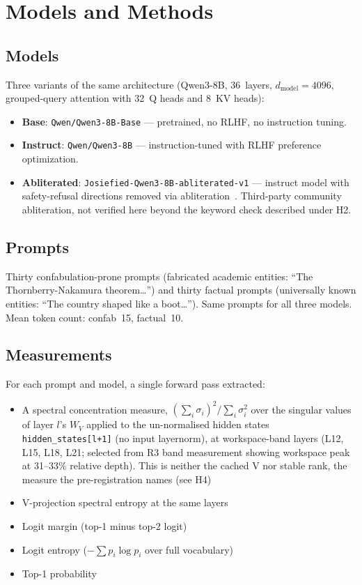 \documentclass[11pt,a4paper]{article}
\begin{document}
\section{Models and Methods}
\label{sec:methods}

\subsection{Models}

Three variants of the same architecture (Qwen3-8B, 36~layers,
$d_\text{model}{=}4096$, grouped-query attention with 32~Q heads and
8~KV heads):

\begin{itemize}[nosep]
\item \textbf{Base}: \texttt{Qwen/Qwen3-8B-Base} --- pretrained,
  no RLHF, no instruction tuning.
\item \textbf{Instruct}: \texttt{Qwen/Qwen3-8B} --- instruction-tuned
  with RLHF preference optimization.
\item \textbf{Abliterated}: \texttt{Josiefied-Qwen3-8B-abliterated-v1}
  --- instruct model with safety-refusal directions removed via
  abliteration~\citep{arditi2024refusal}. Third-party community
  abliteration, not verified here beyond the keyword check described
  under H2.
\end{itemize}

\subsection{Prompts}

Thirty confabulation-prone prompts (fabricated academic entities:
``The Thornberry-Nakamura theorem\ldots'') and thirty factual prompts
(universally known entities: ``The country shaped like a boot\ldots'').
Same prompts for all three models. Mean token count: confab~15,
factual~10.

\subsection{Measurements}

For each prompt and model, a single forward pass extracted:
\begin{itemize}[nosep]
\item A spectral concentration measure,
  $(\sum_i \sigma_i)^2 / \sum_i \sigma_i^2$ over the singular values of
  layer $l$'s $W_V$ applied to the un-normalised hidden states
  \texttt{hidden\_states[l+1]} (no input layernorm), at workspace-band
  layers (L12, L15, L18, L21; selected from R3 band measurement showing
  workspace peak at 31--33\% relative depth). This is neither the
  cached V nor stable rank, the measure the pre-registration names
  (see H4)
\item V-projection spectral entropy at the same layers
\item Logit margin (top-1 minus top-2 logit)
\item Logit entropy ($-\sum p_i \log p_i$ over full vocabulary)
\item Top-1 probability
\end{itemize}
\end{document}
